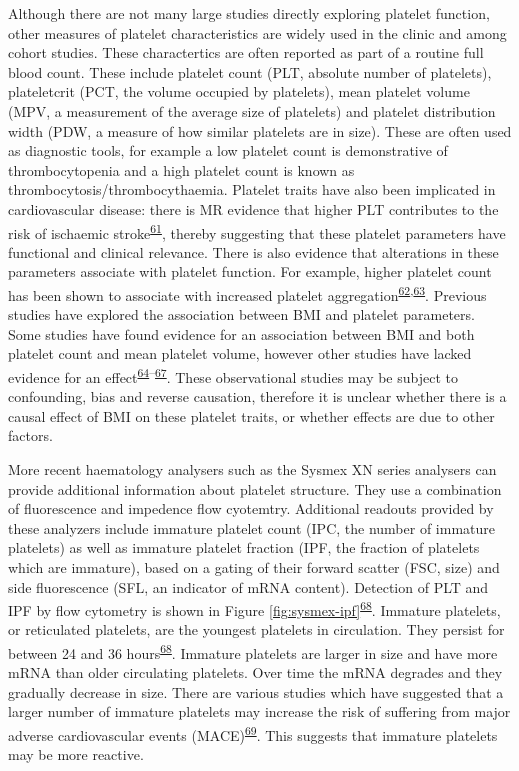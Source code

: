 \documentclass[11pt,twoside]{bristolthesis}
\begin{document}
Although there are not many large studies directly exploring platelet function, other measures of platelet characteristics are widely used in the clinic and among cohort studies. These charactertics are often reported as part of a routine full blood count. These include platelet count (PLT, absolute number of platelets), plateletcrit (PCT, the volume occupied by platelets), mean platelet volume (MPV, a measurement of the average size of platelets) and platelet distribution width (PDW, a measure of how similar platelets are in size). These are often used as diagnostic tools, for example a low platelet count is demonstrative of thrombocytopenia and a high platelet count is known as thrombocytosis/thrombocythaemia. Platelet traits have also been implicated in cardiovascular disease: there is MR evidence that higher PLT contributes to the risk of ischaemic stroke\textsuperscript{\protect\hyperlink{ref-Gill2018}{61}}, thereby suggesting that these platelet parameters have functional and clinical relevance. There is also evidence that alterations in these parameters associate with platelet function. For example, higher platelet count has been shown to associate with increased platelet aggregation\textsuperscript{\protect\hyperlink{ref-Wurtz2012}{62},\protect\hyperlink{ref-Femia2013}{63}}. Previous studies have explored the association between BMI and platelet parameters. Some studies have found evidence for an association between BMI and both platelet count and mean platelet volume, however other studies have lacked evidence for an effect\textsuperscript{\protect\hyperlink{ref-Furuncuoglu2016}{64}--\protect\hyperlink{ref-Heffron2018}{67}}. These observational studies may be subject to confounding, bias and reverse causation, therefore it is unclear whether there is a causal effect of BMI on these platelet traits, or whether effects are due to other factors.

More recent haematology analysers such as the Sysmex XN series analysers can provide additional information about platelet structure. They use a combination of fluorescence and impedence flow cyotemtry. Additional readouts provided by these analyzers include immature platelet count (IPC, the number of immature platelets) as well as immature platelet fraction (IPF, the fraction of platelets which are immature), based on a gating of their forward scatter (FSC, size) and side fluorescence (SFL, an indicator of mRNA content). Detection of PLT and IPF by flow cytometry is shown in Figure \ref{fig:sysmex-ipf}\textsuperscript{\protect\hyperlink{ref-Corpataux2020}{68}}. Immature platelets, or reticulated platelets, are the youngest platelets in circulation. They persist for between 24 and 36 hours\textsuperscript{\protect\hyperlink{ref-Corpataux2020}{68}}. Immature platelets are larger in size and have more mRNA than older circulating platelets. Over time the mRNA degrades and they gradually decrease in size. There are various studies which have suggested that a larger number of immature platelets may increase the risk of suffering from major adverse cardiovascular events (MACE)\textsuperscript{\protect\hyperlink{ref-Ibrahim2014}{69}}. This suggests that immature platelets may be more reactive.
\end{document}
